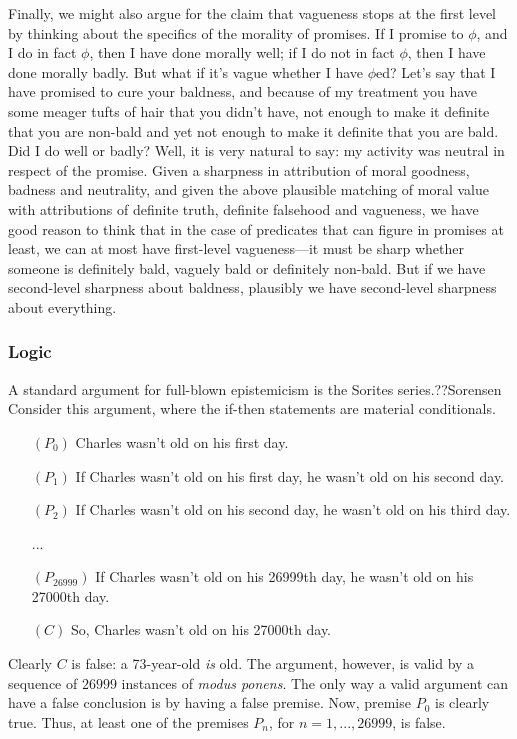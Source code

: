 Finally, we might also argue for the claim that vagueness stops at the first level by thinking about the specifics of the morality of promises. If I promise
to $\phi$, and I do in fact $\phi$, then I have done morally well; if I do not in fact $\phi$, then I have done morally badly.
But what if it's vague whether I have $\phi$ed? Let's say that I have promised to cure your baldness, and because of my treatment
you have some meager tufts of hair that you didn't have, not enough to make it definite that you are non-bald and yet not enough
to make it definite that you are bald. Did I do well or badly? Well, it is very natural to say: my activity was neutral in respect
of the promise. Given a sharpness in attribution of moral goodness, badness and neutrality, and given the above plausible matching
of moral value with attributions of definite truth, definite falsehood and vagueness, we have good reason to think that in the case
of predicates that can figure in promises at least, we can at most have first-level vagueness---it must be sharp whether someone is
definitely bald, vaguely bald or definitely non-bald. But if we have second-level sharpness about baldness, plausibly we have 
second-level sharpness about everything.

\subsubsection{Logic}
A standard argument for full-blown epistemicism is the Sorites series.??Sorensen
Consider this argument, where the if-then statements are material conditionals.
\begin{itemize}
\item[$(P_0)$] Charles wasn't old on his first day.
\item[$(P_1)$] If Charles wasn't old on his first day, he wasn't old on his second day.
\item[$(P_2)$] If Charles wasn't old on his second day, he wasn't old on his third day.
\item[...] \ {}
\item[$(P_{26999})$] If Charles wasn't old on his 26999th day, he wasn't old on his 27000th day.
\item[$(C)$] So, Charles wasn't old on his 27000th day.
\end{itemize}

Clearly $C$ is false: a 73-year-old \textit{is} old. The argument, however, is valid by 
a sequence of $26999$ instances of \textit{modus ponens}. The only way a valid argument
can have a false conclusion is by having a false premise. Now, premise $P_0$ is clearly
true. Thus, at least one of the premises $P_n$, for $n=1,...,26999$, is false. 


